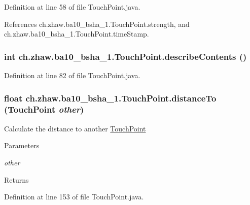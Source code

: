 Definition at line 58 of file TouchPoint.java.

References ch.zhaw.ba10\_\-bsha\_\-1.TouchPoint.strength, and ch.zhaw.ba10\_\-bsha\_\-1.TouchPoint.timeStamp.\hypertarget{classch_1_1zhaw_1_1ba10__bsha__1_1_1TouchPoint_ad5596f285f8ff8daf89cf36f4074df0f}{
\subsubsection[{describeContents}]{\setlength{\rightskip}{0pt plus 5cm}int ch.zhaw.ba10\_\-bsha\_\-1.TouchPoint.describeContents ()}}
\label{classch_1_1zhaw_1_1ba10__bsha__1_1_1TouchPoint_ad5596f285f8ff8daf89cf36f4074df0f}


Definition at line 82 of file TouchPoint.java.\hypertarget{classch_1_1zhaw_1_1ba10__bsha__1_1_1TouchPoint_afb4bcfacdc81a0922e69fcef9f07dbf8}{
\subsubsection[{distanceTo}]{\setlength{\rightskip}{0pt plus 5cm}float ch.zhaw.ba10\_\-bsha\_\-1.TouchPoint.distanceTo ({\bf TouchPoint} {\em other})}}
\label{classch_1_1zhaw_1_1ba10__bsha__1_1_1TouchPoint_afb4bcfacdc81a0922e69fcef9f07dbf8}
Calculate the distance to another \hyperlink{classch_1_1zhaw_1_1ba10__bsha__1_1_1TouchPoint}{TouchPoint}


\begin{DoxyParams}{Parameters}
\item[{\em other}]\end{DoxyParams}
\begin{DoxyReturn}{Returns}

\end{DoxyReturn}


Definition at line 153 of file TouchPoint.java.

